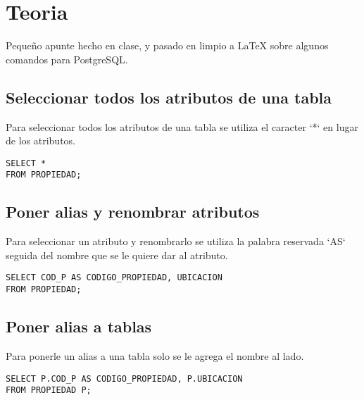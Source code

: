 \documentclass{templateNote}
\begin{document}
\portada %
\margenes %


\section{Teoria}
\indent
Pequeño apunte hecho en clase, y pasado en limpio a LaTeX sobre algunos comandos para PostgreSQL.

\subsection{Seleccionar todos los atributos de una tabla}
\indent
Para seleccionar todos los atributos de una tabla se utiliza el caracter `*` en lugar de los atributos.
\begin{tcolorbox}
    [colback=gray!5!white,colframe=gray!75!black,fonttitle=\bfseries,title=SQL]
    \begin{sqlcode}
    \end{sqlcode}
    \begin{verbatim}
SELECT *
FROM PROPIEDAD;
    \end{verbatim}
\end{tcolorbox}


\subsection{Poner alias y renombrar atributos}
\indent
Para seleccionar un atributo y renombrarlo se utiliza la palabra reservada `AS` seguida del nombre que se le quiere dar al atributo.
\begin{tcolorbox}
    [colback=gray!5!white,colframe=gray!75!black,fonttitle=\bfseries,title=SQL]
    \begin{sqlcode}
    \end{sqlcode}
    \begin{verbatim}
SELECT COD_P AS CODIGO_PROPIEDAD, UBICACION
FROM PROPIEDAD;
    \end{verbatim}
\end{tcolorbox}

\subsection{Poner alias a tablas}
\indent
Para ponerle un alias a una tabla solo se le agrega el nombre al lado.
\begin{tcolorbox}
    [colback=gray!5!white,colframe=gray!75!black,fonttitle=\bfseries,title=SQL]
    \begin{sqlcode}
    \end{sqlcode}
    \begin{verbatim}
SELECT P.COD_P AS CODIGO_PROPIEDAD, P.UBICACION
FROM PROPIEDAD P;
    \end{verbatim}
\end{tcolorbox}
\end{document}
